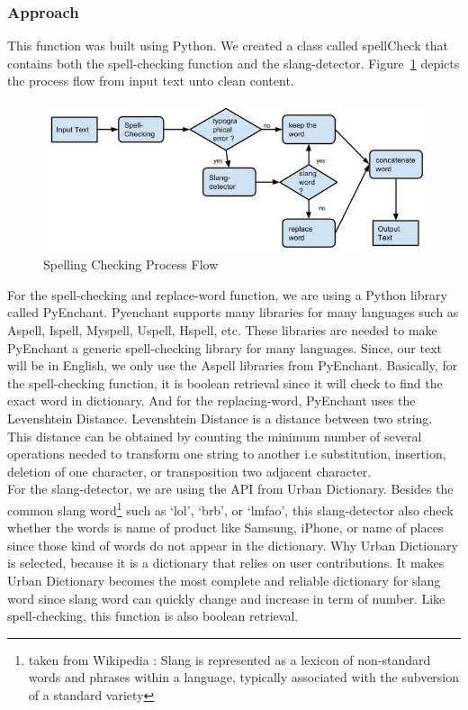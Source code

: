 \subsubsection*{Approach}
This function was built using Python. We created a class called spellCheck that contains both the spell-checking function and the slang-detector. Figure~\ref{fig:spellprocess}  depicts the process flow from input text unto clean content. 
\begin{figure}
\centering
\includegraphics[scale=0.5]{images/spellprocess.png}
\caption{Spelling Checking Process Flow}
\label{fig:spellprocess}
\end{figure}
For the spell-checking and replace-word function, we are using a Python library called PyEnchant. Pyenchant supports many libraries for many languages such as Aspell, Ispell, Myspell, Uspell, Hspell, etc. These libraries are needed to make PyEnchant a generic spell-checking library for many languages. Since, our text will be in English, we only use the Aspell libraries from PyEnchant. Basically, for the spell-checking function, it is boolean retrieval since it will check to find the exact word in dictionary. And for the replacing-word, PyEnchant uses the Levenshtein Distance. Levenshtein Distance is a distance between two string. This distance can be obtained by counting the minimum number of several operations needed to transform one string to another i.e substitution, insertion, deletion of one character, or transposition two adjacent character. \\
For the slang-detector, we are using the API from Urban Dictionary. Besides the common slang word\footnote{taken from Wikipedia : Slang is represented as a lexicon of non-standard words and phrases within a language, typically associated with the subversion of a standard variety} such as ‘lol’, ‘brb’, or ‘lmfao’, this slang-detector also check whether the words is name of product like Samsung, iPhone, or name of places since those kind of words do not appear in the dictionary. Why Urban Dictionary is selected, because it is a dictionary that relies on user contributions. It makes Urban Dictionary becomes the most complete and reliable dictionary for  slang word since slang word can quickly change and increase in term of number. Like spell-checking, this function is also  boolean retrieval.  \\
